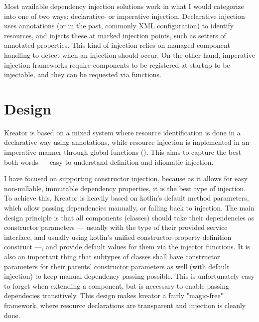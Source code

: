 		Most available dependency injection solutions work in what I would categorize into one of two ways: declarative- or imperative injection. Declarative injection uses annotations (or in the past, commonly XML configuration) to identify resources, and injects these at marked injection points, such as setters of annotated properties. This kind of injection relies on managed component handling to detect when an injection should occur. On the other hand, imperative injection frameworks require components to be registered at startup to be injectable, and they can be requested via functions.
	
	\section{Design}
	
		Kreator is based on a mixed system where resource identification is done in a declarative way using annotations, while resource injection is implemented in an imperative manner through global functions (). This aims to capture the best both words --- easy to understand definition and idiomatic injection.
		
		I have focused on supporting constructor injection, because as it allows for easy non-nullable, immutable dependency properties, it is the best type of injection. To achieve this, Kreator is heavily based on kotlin's default method parameters, which allow passing dependencies manually, or falling back to injection. The main design principle is that all components (classes) should take their dependencies as constructor parameters --- usually with the type of their provided service interface, and usually using kotlin's unified constructor-property definition construct ---, and provide default values for them via the injector functions. It is also an important thing that subtypes of classes shall have constructor parameters for their parents' constructor parameters as well (with default injection) to keep manual dependency passing possible. This is unfortunately easy to forget when extending a component, but is necessary to enable passing dependecies transitively. This design makes kreator a fairly "magic-free" framework, where resource declarations are transparent and injection is cleanly done.
		
